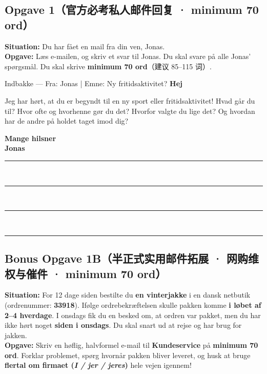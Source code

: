 \subsection*{Opgave 1（官方必考私人邮件回复 · minimum 70 ord）}

\textbf{Situation:} Du har fået en mail fra din ven, Jonas.\\
\textbf{Opgave:} Læs e-mailen, og skriv et svar til Jonas. Du skal svare på alle Jonas’ spørgsmål. Du skal skrive \textbf{minimum 70 ord}（建议 85--115 词）.

\begin{emailbox}{Indbakke — Fra: Jonas \quad | \quad Emne: Ny fritidsaktivitet?}
\textbf{Hej}

Jeg har hørt, at du er begyndt til en ny sport eller fritidsaktivitet! Hvad går du til? Hvor ofte og hvorhenne gør du det? Hvorfor valgte du lige det? Og hvordan har de andre på holdet taget imod dig?

\textbf{Mange hilsner}\\
\textbf{Jonas}
\end{emailbox}

\begin{tcolorbox}[enhanced, unbreakable, colback=white, colframe=NCDNavy, coltitle=white, fonttitle=\bfseries, title={Dit svar — Til: Jonas \quad | \quad Emne: Ny fritidsaktivitet}, arc=2pt, boxrule=0.8pt, left=10pt, right=10pt, top=5pt, bottom=5pt]
\rule{\linewidth}{0.4pt}\\[0.38em]
\rule{\linewidth}{0.4pt}\\[0.38em]
\rule{\linewidth}{0.4pt}\\[0.38em]
\rule{\linewidth}{0.4pt}
\end{tcolorbox}

\subsection*{Bonus Opgave 1B（半正式实用邮件拓展 · 网购维权与催件 · minimum 70 ord）}

\textbf{Situation:} For 12 dage siden bestilte du \textbf{en vinterjakke} i en dansk netbutik (ordrenummer: \textbf{33918}). Ifølge ordrebekræftelsen skulle pakken komme \textbf{i løbet af 2--4 hverdage}. I onsdags fik du en besked om, at ordren var pakket, men du har ikke hørt noget \textbf{siden i onsdags}. Du skal snart ud at rejse og har brug for jakken.\\
\textbf{Opgave:} Skriv en høflig, halvformel e-mail til \textbf{Kundeservice} på \textbf{minimum 70 ord}. Forklar problemet, spørg hvornår pakken bliver leveret, og husk at bruge \textbf{flertal om firmaet (\textit{I / jer / jeres})} hele vejen igennem!

